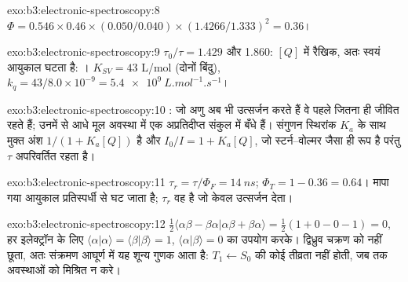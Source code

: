 \begin{solution}{exo:b3:electronic-spectroscopy:8}
$\Phi = 0.546 \times 0.46 \times (0.050/0.040) \times (1.4266/1.333)^2 = 0.36$।
\end{solution}

\begin{solution}{exo:b3:electronic-spectroscopy:9}
$\tau_0/\tau = 1.429$ और 1.860: $[Q]$ में रैखिक, अतः स्वयं आयुकाल
घटता है: । $K_{SV} = 43$ L/mol (दोनों बिंदु), $k_q = 43/8.0
\times 10^{-9} = \qty{5.4e9}{L.mol^{-1}.s^{-1}}$।
\end{solution}

\begin{solution}{exo:b3:electronic-spectroscopy:10}
: जो अणु अब भी उत्सर्जन करते हैं वे पहले जितना ही जीवित रहते हैं; उनमें से
आधे मूल अवस्था में एक अप्रतिदीप्त संकुल में बँधे हैं। संगुणन स्थिरांक
$K_a$ के साथ मुक्त अंश $1/(1 + K_a[Q])$ है और $I_0/I = 1 +
K_a[Q]$, जो स्टर्न--वोल्मर जैसा ही रूप है परंतु $\tau$ अपरिवर्तित रहता है।
\end{solution}

\begin{solution}{exo:b3:electronic-spectroscopy:11}
$\tau_r = \tau/\Phi_F = \qty{14}{ns}$; $\Phi_T = 1 - 0.36 = 0.64$। मापा गया आयुकाल
प्रतिस्पर्धी  से घट जाता है; $\tau_r$ वह है जो केवल उत्सर्जन
देता।
\end{solution}

\begin{solution}{exo:b3:electronic-spectroscopy:12}
$\frac12\langle\alpha\beta - \beta\alpha|\alpha\beta + \beta\alpha\rangle = \frac12(1 + 0 - 0 - 1) = 0$, हर इलेक्ट्रॉन के लिए
$\langle\alpha|\alpha\rangle = \langle\beta|\beta\rangle = 1$, $\langle\alpha|\beta\rangle = 0$ का उपयोग करके।
द्विध्रुव  चक्रण को नहीं छूता, अतः संक्रमण आघूर्ण में यह
शून्य गुणक आता है: $T_1 \leftarrow S_0$ की कोई तीव्रता नहीं होती, जब तक 
अवस्थाओं को मिश्रित न करे।
\end{solution}

